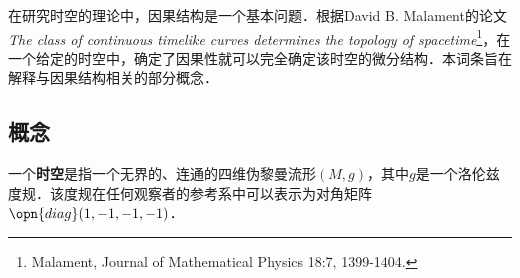 
在研究时空的理论中，因果结构是一个基本问题．根据David B. Malament的论文\textsl{The class of continuous timelike curves determines the topology of spacetime}\footnote{Malament, Journal of Mathematical Physics 18:7, 1399-1404. }，在一个给定的时空中，确定了因果性就可以完全确定该时空的微分结构．本词条旨在解释与因果结构相关的部分概念．

\subsection{概念}

一个\textbf{时空}是指一个无界的、连通的四维伪黎曼流形$(M, g)$，其中$g$是一个洛伦兹度规．该度规在任何观察者的参考系中可以表示为对角矩阵$\opn{diag}(1, -1, -1, -1)$．




